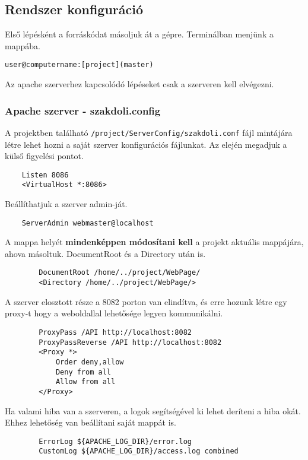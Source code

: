 \subsection{Rendszer konfiguráció}
Első lépésként a forráskódat másoljuk át a gépre.
Terminálban menjünk a mappába.
\begin{verbatim}
user@computername:[project](master)
\end{verbatim}

Az apache szerverhez kapcsolódó lépéseket csak a szerveren kell elvégezni.
\subsubsection{Apache szerver - szakdoli.config}
	A projektben található \texttt{/project/ServerConfig/szakdoli.conf} fájl mintájára létre lehet hozni a saját szerver konfigurációs fájlunkat.
	\newline
	Az elején megadjuk a külső figyelési pontot.
	\begin{verbatim}
	Listen 8086
	<VirtualHost *:8086>
	\end{verbatim}

	Beállíthatjuk a szerver admin-ját.
	
	\begin{verbatim}
	ServerAdmin webmaster@localhost
	\end{verbatim}

	A mappa helyét \textbf{mindenképpen módosítani kell} a projekt aktuális mappájára, ahova másoltuk.
	DocumentRoot és a Directory után is.
	
	\begin{verbatim}
		DocumentRoot /home/../project/WebPage/
		<Directory /home/../project/WebPage/>
	\end{verbatim}
	
	A szerver elosztott része a 8082 porton van elindítva, és erre hozunk létre egy proxy-t hogy a weboldallal lehetősége legyen kommunikálni.
	
	\begin{verbatim}
		ProxyPass /API http://localhost:8082
		ProxyPassReverse /API http://localhost:8082
		<Proxy *>
		    Order deny,allow
		    Deny from all
		    Allow from all
		</Proxy> 
	\end{verbatim}
	
	Ha valami hiba van a szerveren, a logok segítségével ki lehet deríteni a hiba okát. Ehhez lehetőség van beállítani saját mappát is.

	\begin{verbatim}
		ErrorLog ${APACHE_LOG_DIR}/error.log
		CustomLog ${APACHE_LOG_DIR}/access.log combined
	\end{verbatim}

